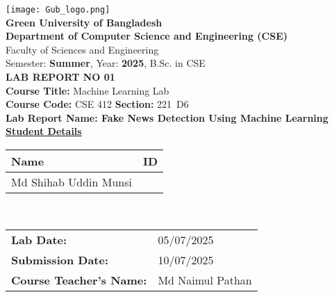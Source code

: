 \documentclass[12pt]{article}
\begin{document}
\begin{center}
    \texttt{[image: Gub\_logo.png]}\\[1em]
    \textbf{\Large Green University of Bangladesh}\\[0.5em]
    \textbf{Department of Computer Science and Engineering (CSE)}\\[0.5em]
    Faculty of Sciences and Engineering\\
    Semester: \textbf{Summer}, Year: \textbf{2025}, B.Sc. in CSE\\[1.5em]
    \textbf{\Large LAB REPORT NO 01}\\[1em]
    \textbf{Course Title:} Machine Learning Lab\\
    \textbf{Course Code:} CSE 412 \hspace{1cm} \textbf{Section:} 221\ D6\\[2em]
    \textbf{Lab Report Name: Fake News Detection Using Machine Learning}\\[2em]
    \textbf{\underline{Student Details}}\\[0.5em]
    \begin{tabular}{|>{\centering\arraybackslash}m{6cm}|>{\centering\arraybackslash}m{6cm}|}
        \hline
        \textbf{Name} & \textbf{ID} \\
        \hline
        Md Shihab Uddin Munsi & 212002054 \\
        \hline
    \end{tabular}\\[2em]
    \begin{tabular}{ll}
        \textbf{Lab Date:} & 05/07/2025\\
        \textbf{Submission Date:} & 10/07/2025 \\
        \textbf{Course Teacher's Name:} & Md Naimul Pathan \\
    \end{tabular}\\[2em]
\end{center}
\end{document}
